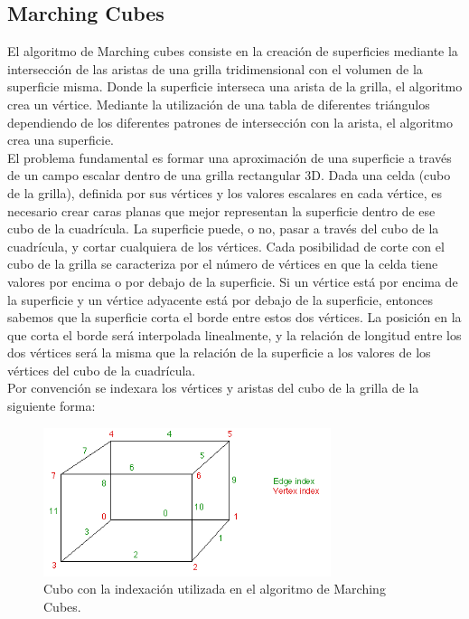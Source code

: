\documentclass[12pt]{article}
\begin{document}
\subsection{Marching Cubes}
El algoritmo de Marching cubes\cite{marching}\cite{marchingcubes} consiste en la creación de superficies mediante la intersección de las aristas de una grilla tridimensional con el volumen de la superficie misma. Donde la superficie interseca una arista de la grilla, el algoritmo crea un vértice. Mediante la utilización de una tabla de diferentes triángulos dependiendo de los diferentes patrones de intersección con la arista, el algoritmo crea una superficie.
\\El problema fundamental es formar una aproximación de una superficie a través de un campo escalar dentro de una grilla rectangular 3D. Dada una celda (cubo de la grilla), definida por sus vértices y los valores escalares en cada vértice, es necesario crear caras planas que mejor representan la superficie dentro de ese cubo de la cuadrícula. La superficie puede, o no, pasar a través del cubo de la cuadrícula, y cortar cualquiera de los vértices. Cada posibilidad de corte con el cubo de la grilla se caracteriza por el número de vértices en que la celda tiene valores por encima o por debajo de la superficie. Si un vértice está por encima de la superficie y un vértice adyacente está por debajo de la superficie, entonces sabemos que la superficie corta el borde entre estos dos vértices. La posición en la que corta el borde será interpolada linealmente, y la relación de longitud entre los dos vértices será la misma que la relación de la superficie a los valores de los vértices del cubo de la cuadrícula.
\\Por convención se indexara los vértices y aristas del cubo de la grilla de la siguiente forma:
\begin{figure}[h!]
\includegraphics[width=0.75\textwidth,center]{marchingcubes1.png}
\caption{Cubo con la indexación utilizada en el algoritmo de Marching Cubes.}
\end{figure}
\end{document}
